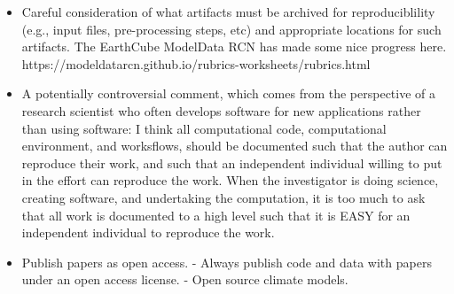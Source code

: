\documentclass{article}
\begin{document}
\begin{itemize}
	\item Careful consideration of what artifacts must be archived for reproduciblility (e.g., input files, pre-processing steps, etc) and appropriate locations for such artifacts. The EarthCube ModelData RCN has made some nice progress here. https://modeldatarcn.github.io/rubrics-worksheets/rubrics.html
	\item A potentially controversial comment, which comes from the perspective of a research scientist who often develops software for new applications rather than using software: I think all computational code, computational environment, and worksflows, should be documented such that the author can reproduce their work, and such that an independent individual willing to put in the effort can reproduce the work. When the investigator is doing science, creating software, and undertaking the computation, it is too much to ask that all work is documented to a high level such that it is EASY for an independent individual to reproduce the work.
	\item Publish papers as open access.
- Always publish code and data with papers under an open access license.
- Open source climate models.
\end{itemize}
\end{document}
